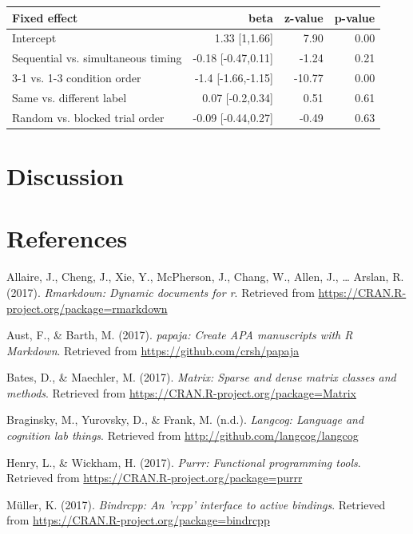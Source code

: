 \documentclass[english,floatsintext,man]{apa6}
\theoremstyle{definition}
\theoremstyle{definition}
\theoremstyle{remark}
\begin{document}
\begin{tabular}{lrrr}
\toprule
Fixed effect & beta & z-value & p-value\\
\midrule
Intercept & 1.33 [1,1.66] & 7.90 & 0.00\\
Sequential vs. simultaneous timing & -0.18 [-0.47,0.11] & -1.24 & 0.21\\
3-1 vs. 1-3 condition order & -1.4 [-1.66,-1.15] & -10.77 & 0.00\\
Same vs. different label & 0.07 [-0.2,0.34] & 0.51 & 0.61\\
Random vs. blocked trial order & -0.09 [-0.44,0.27] & -0.49 & 0.63\\
\bottomrule
\end{tabular}

\section{Discussion}\label{discussion}

\newpage

\section{References}\label{references}

\setlength{\parindent}{-0.5in} \setlength{\leftskip}{0.5in}

\hypertarget{refs}{}
\hypertarget{ref-R-rmarkdown}{}
Allaire, J., Cheng, J., Xie, Y., McPherson, J., Chang, W., Allen, J.,
\ldots{} Arslan, R. (2017). \emph{Rmarkdown: Dynamic documents for r}.
Retrieved from \url{https://CRAN.R-project.org/package=rmarkdown}

\hypertarget{ref-R-papaja}{}
Aust, F., \& Barth, M. (2017). \emph{papaja: Create APA manuscripts with
R Markdown}. Retrieved from \url{https://github.com/crsh/papaja}

\hypertarget{ref-R-Matrix}{}
Bates, D., \& Maechler, M. (2017). \emph{Matrix: Sparse and dense matrix
classes and methods}. Retrieved from
\url{https://CRAN.R-project.org/package=Matrix}

\hypertarget{ref-R-langcog}{}
Braginsky, M., Yurovsky, D., \& Frank, M. (n.d.). \emph{Langcog:
Language and cognition lab things}. Retrieved from
\url{http://github.com/langcog/langcog}

\hypertarget{ref-R-purrr}{}
Henry, L., \& Wickham, H. (2017). \emph{Purrr: Functional programming
tools}. Retrieved from \url{https://CRAN.R-project.org/package=purrr}

\hypertarget{ref-R-bindrcpp}{}
Müller, K. (2017). \emph{Bindrcpp: An 'rcpp' interface to active
bindings}. Retrieved from
\url{https://CRAN.R-project.org/package=bindrcpp}
\end{document}
